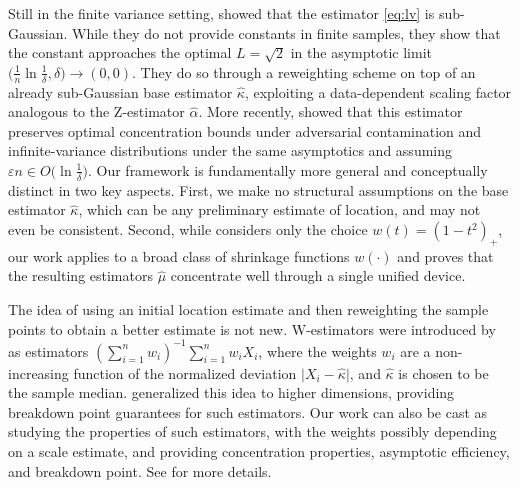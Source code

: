 \documentclass{article}
\theoremstyle{plain}
\theoremstyle{definition}
\def\eps{\varepsilon}
\begin{document}
Still in the finite variance setting, \cite{lee2022optimal} showed that the estimator \eqref{eq:lv} is sub-Gaussian. While they do not provide constants in finite samples, they show that the constant approaches the optimal $L = \sqrt{2}$ in the asymptotic limit $\big(\frac{1}{n}\ln\frac{1}{\delta}, \delta\big)\to (0,0)$. They do so through a reweighting scheme on top of an already sub-Gaussian base estimator $\widehat{\kappa}$, exploiting a data-dependent scaling factor analogous to the Z-estimator \( \widehat{\alpha }  \). More recently, \cite{lee2025} showed that this estimator preserves optimal concentration bounds under adversarial contamination and infinite-variance distributions under the same asymptotics and assuming $\eps n \in O\big(\ln\frac{1}{\delta}\big)$. Our framework is fundamentally more general and conceptually distinct in two key aspects. First, we make no structural assumptions on the base estimator \(\widehat{\kappa}\), which can be any preliminary estimate of location, and may not even be consistent. Second, while \cite{lee2022optimal} considers only the choice $w(t) = (1-t^2)_+$, our work applies to a broad class of shrinkage functions \(w(\cdot)\) and proves that the resulting estimators $\widehat{\mu}$ concentrate well through a single unified device. %

The idea of using an initial location estimate and then reweighting the sample points to obtain a better estimate is not new. W-estimators were introduced by \cite{mosteller1977data} as estimators \( (\sum_{i=1}^n w_i)^{-1}\sum_{i=1}^nw_i X_i \), where the weights \( w_i \) are a non-increasing function of the normalized deviation \( \lvert X_i - \widehat{\kappa }  \rvert  \), and \( \widehat{\kappa }  \) is chosen to be the sample median. \cite{donoho1992breakdown} generalized this idea to higher dimensions, providing breakdown point guarantees for such estimators. Our work can also be cast as studying the properties of such estimators, with the weights possibly depending on a scale estimate, and providing concentration properties, asymptotic efficiency, and breakdown point. See  for more details.
\end{document}
